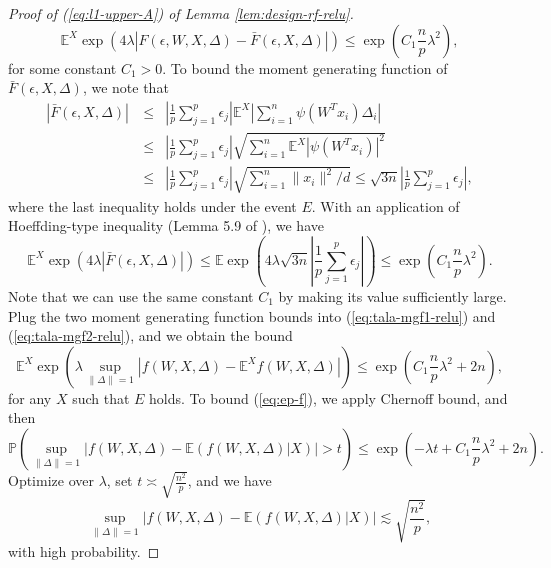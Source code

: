 \begin{proof}[Proof of (\ref{eq:l1-upper-A}) of Lemma \ref{lem:design-rf-relu}]
$$\mathbb{E}^{X}\exp\left(4\lambda|F(\epsilon,W,X,\Delta)-\bar{F}(\epsilon,X,\Delta)|\right) \leq \exp\left(C_1\frac{n}{p}\lambda^2\right),$$
for some constant $C_1>0$. To bound the moment generating function of $\bar{F}(\epsilon,X,\Delta)$, we note that
\begin{eqnarray*}
|\bar{F}(\epsilon,X,\Delta)|\ &\leq& \left|\frac{1}{p}\sum_{j=1}^p\epsilon_j\right|\mathbb{E}^X\left|\sum_{i=1}^n\psi(W^Tx_i)\Delta_i\right| \\
&\leq& \left|\frac{1}{p}\sum_{j=1}^p\epsilon_j\right|\sqrt{\sum_{i=1}^n\mathbb{E}^X|\psi(W^Tx_i)|^2} \\
&\leq& \left|\frac{1}{p}\sum_{j=1}^p\epsilon_j\right|\sqrt{\sum_{i=1}^n\|x_i\|^2/d} \leq \sqrt{3n}\left|\frac{1}{p}\sum_{j=1}^p\epsilon_j\right|,
\end{eqnarray*}
where the last inequality holds under the event $E$. With an application of Hoeffding-type inequality (Lemma 5.9 of \cite{vershynin2010introduction}), we have
$$\mathbb{E}^{X}\exp\left(4\lambda |\bar{F}(\epsilon,X,\Delta)|\right)\leq \mathbb{E}\exp\left(4\lambda\sqrt{3n}\left|\frac{1}{p}\sum_{j=1}^p\epsilon_j\right|\right)\leq \exp\left(C_1\frac{n}{p}\lambda^2\right).$$
Note that we can use the same constant $C_1$ by making its value sufficiently large. Plug the two moment generating function bounds into (\ref{eq:tala-mgf1-relu}) and (\ref{eq:tala-mgf2-relu}), and we obtain the bound
$$\mathbb{E}^X\exp\left(\lambda \sup_{\|\Delta\|=1}\left|f(W,X,\Delta)-\mathbb{E}^Xf(W,X,\Delta)\right|\right)\leq \exp\left(C_1\frac{n}{p}\lambda^2+2n\right),$$
for any $X$ such that $E$ holds. To bound (\ref{eq:ep-f}), we apply Chernoff bound, and then
$$\mathbb{P}\left(\sup_{\|\Delta\|=1}\left|f(W,X,\Delta)-\mathbb{E}(f(W,X,\Delta)|X)\right| > t\right) \leq \exp\left(-\lambda t + C_1\frac{n}{p}\lambda^2+2n\right).$$
Optimize over $\lambda$, set $t\asymp \sqrt{\frac{n^2}{p}}$, and we have
$$\sup_{\|\Delta\|=1}\left|f(W,X,\Delta)-\mathbb{E}(f(W,X,\Delta)|X)\right|\lesssim \sqrt{\frac{n^2}{p}},$$
with high probability.


\end{proof}
